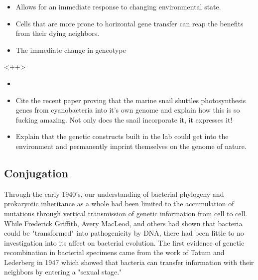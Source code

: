 \begin{itemize}
	\item Allows for an immediate response to changing environmental state.
	\item Cells that are more prone to horizontal gene transfer can reap the
		benefits from their dying neighbors. 
	\item The immediate change in geneotype 
\end{itemize}<++>
\begin{itemize}
	\item  
	\item Cite the recent paper proving that the marine snail shuttles
		photosynthesis genes from cyanobacteria into it's own genome and
		explain how this is so fucking amazing. Not only does the snail
		incorporate it, it expresses it!
	\item Explain that the genetic constructs built in the lab could get
		into the environment and permanently imprint themselves on the
		genome of nature. 
\end{itemize}
\subsection*{Conjugation}
Through the early 1940's, our understanding of bacterial phylogeny and
prokaryotic inheritance as a whole had been limited to the accumulation of
mutations through vertical transmission of genetic information from cell to
cell. While Frederick Griffith, Avery MacLeod, and others had shown that
bacteria could be "transformed" into pathogenicity by
DNA\cite{Griffith:1928vg}\cite{Avery:2014wx}, there had been little to no
investigation into its affect on bacterial evolution. The first evidence of
genetic recombination in bacterial specimens came from the work of Tatum and
Lederberg in 1947 which showed that bacteria can transfer information with their
neighbors by entering a "sexual stage."\cite{Tatum:1947va}

